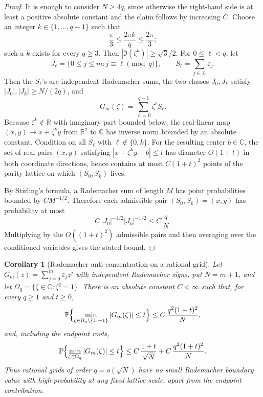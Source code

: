 \documentclass[11pt]{amsart}
\numberwithin{equation}{section}
\newtheorem{corollary}[theorem]{Corollary}
\theoremstyle{definition}
\theoremstyle{remark}
\newcommand{\C}{\mathbb C}
\newcommand{\R}{\mathbb R}
\newcommand{\Prob}{\mathbb P}
\newcommand{\abs}[1]{\left\lvert #1\right\rvert}
\begin{document}
\begin{proof}
It is enough to consider \(N\ge4q\), since otherwise the right-hand side is at
least a positive absolute constant and the claim follows by increasing \(C\).
Choose an integer \(k\in\{1,\ldots,q-1\}\) such that
\[
  \frac{\pi}{3}\le \frac{2\pi k}{q}\le \frac{2\pi}{3};
\]
such a \(k\) exists for every \(q\ge3\).  Then
\(\abs{\Im(\zeta^k)}\ge\sqrt3/2\).  For \(0\le\ell<q\), let
\[
  J_\ell=\{0\le j\le m:j\equiv \ell\pmod q\},\qquad
  S_\ell=\sum_{j\in J_\ell}\varepsilon_j .
\]
Then the \(S_\ell\)'s are independent Rademacher sums, the two classes
\(J_0,J_k\) satisfy \(\abs{J_0},\abs{J_k}\ge N/(2q)\), and
\[
  G_m(\zeta)=\sum_{\ell=0}^{q-1}\zeta^\ell S_\ell .
\]
Because \(\zeta^k\notin\R\) with imaginary part bounded below, the real-linear
map \((x,y)\mapsto x+\zeta^k y\) from \(\R^2\) to \(\C\) has inverse norm
bounded by an absolute constant.  Condition on all \(S_\ell\) with
\(\ell\notin\{0,k\}\).  For the resulting center \(b\in\C\), the set of real
pairs \((x,y)\) satisfying \(\abs{x+\zeta^k y-b}\le t\) has diameter \(O(1+t)\)
in both coordinate directions, hence contains at most \(C(1+t)^2\) points of
the parity lattice on which \((S_0,S_k)\) lives.

By Stirling's formula, a Rademacher sum of length \(M\) has point probabilities
bounded by \(CM^{-1/2}\).  Therefore each admissible pair \((S_0,S_k)=(x,y)\)
has probability at most
\[
  C\,\abs{J_0}^{-1/2}\abs{J_k}^{-1/2}\le C\,\frac qN.
\]
Multiplying by the \(O((1+t)^2)\) admissible pairs and then averaging over the
conditioned variables gives the stated bound.
\end{proof}

\begin{corollary}[Rademacher anti-concentration on a rational grid]\label{cor:rademacher-root-grid}
Let \(G_m(z)=\sum_{j=0}^m\varepsilon_jz^j\) with independent Rademacher signs,
put \(N=m+1\), and let \(\Omega_q=\{\zeta\in\C:\zeta^q=1\}\).  There is an
absolute constant \(C<\infty\) such that, for every \(q\ge1\) and \(t\ge0\),
\[
  \Prob\Bigl\{\min_{\zeta\in\Omega_q\setminus\{1,-1\}}\abs{G_m(\zeta)}
       \le t\Bigr\}
  \le C\,\frac{q^2(1+t)^2}{N},
\]
and, including the endpoint roots,
\[
  \Prob\Bigl\{\min_{\zeta\in\Omega_q}\abs{G_m(\zeta)}\le t\Bigr\}
  \le C\,\frac{1+t}{\sqrt N}
      +C\,\frac{q^2(1+t)^2}{N}.
\]
Thus rational grids of order \(q=o(\sqrt N)\) have no small Rademacher
boundary value with high probability at any fixed lattice scale, apart from the
endpoint contribution.
\end{corollary}
\end{document}
